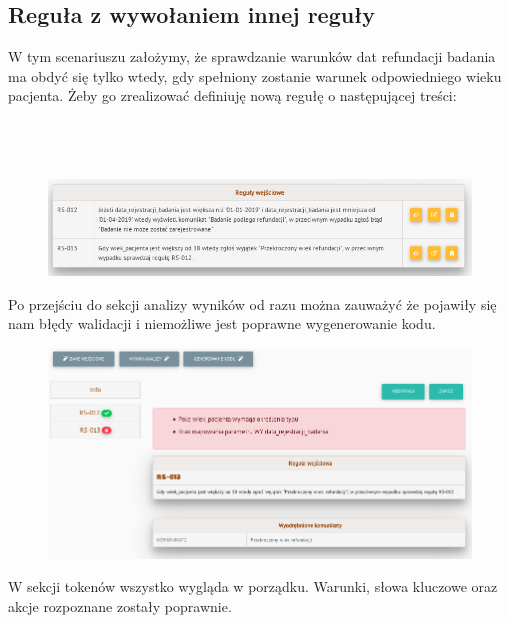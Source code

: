 \subsection{Reguła z wywołaniem innej reguły}
W tym scenariuszu założymy, że sprawdzanie warunków dat refundacji badania ma obdyć się tylko wtedy, gdy spełniony zostanie warunek odpowiedniego wieku pacjenta. Żeby go zrealizować definiuję nową regułę o następującej treści:
\\ \\
\\ \\

\begin{figure}[H]
	\centering
	\includegraphics[scale=0.8]{img/app-eksperymenty/p4-1.png}
\end{figure}
Po przejściu do sekcji analizy wyników od razu można zauważyć że pojawiły się nam błędy walidacji  i niemożliwe jest poprawne wygenerowanie kodu.
\begin{figure}[H]
	\centering
	\includegraphics[scale=0.7]{img/app-eksperymenty/p4-1_5.png}
\end{figure}
W sekcji tokenów wszystko wygląda w porządku. Warunki, słowa kluczowe oraz akcje rozpoznane zostały poprawnie.  

